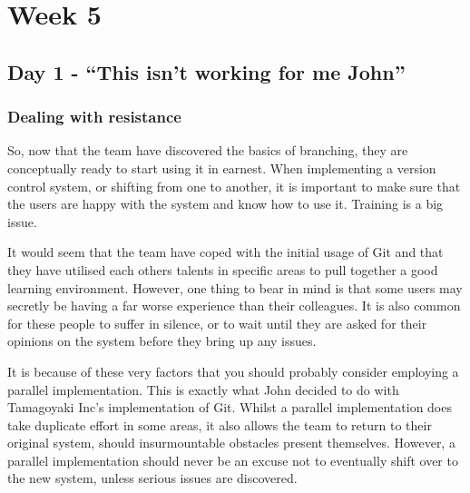 \cleardoublepage
\chapter{Week 5}
\section{Day 1 - ``This isn't working for me John''}
\subsection{Dealing with resistance}
So, now that the team have discovered the basics of branching, they are conceptually ready to start using it in earnest.
When implementing a version control system, or shifting from one to another, it is important to make sure that the users are happy with the system and know how to use it.
Training is a big issue.

It would seem that the team have coped with the initial usage of Git and that they have utilised each others talents in specific areas to pull together a good learning environment.
However, one thing to bear in mind is that some users may secretly be having a far worse experience than their colleagues.
It is also common for these people to suffer in silence, or to wait until they are asked for their opinions on the system before they bring up any issues.

It is because of these very factors that you should probably consider employing a parallel implementation.
This is exactly what John decided to do with Tamagoyaki Inc's implementation of Git.
Whilst a parallel implementation does take duplicate effort in some areas, it also allows the team to return to their original system, should insurmountable obstacles present themselves.
However, a parallel implementation should never be an excuse not to eventually shift over to the new system, unless serious issues are discovered.

